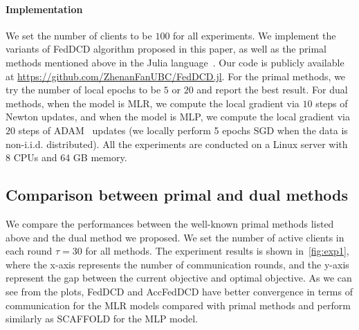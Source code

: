 \paragraph{Implementation}  We set the number of clients to be $100$ for all experiments. We implement the variants of FedDCD algorithm proposed in this paper, as well as the primal methods mentioned above in the Julia language~\citep{bezanson2017julia}. Our code is publicly available at \url{https://github.com/ZhenanFanUBC/FedDCD.jl}. For the primal methods, we try the number of local epochs to be $5$ or $20$ and report the best result. For dual methods, when the model is MLR, we compute the local gradient via $10$ steps of Newton updates, and when the model is MLP, we compute the local gradient via $20$ steps of ADAM~\citep{kingma2014adam} updates (we locally perform 5 epochs SGD when the data is non-i.i.d. distributed). All the experiments are conducted on a Linux server with 8 CPUs and 64 GB memory. 

\subsection{Comparison between primal and dual methods} \label{sec:exp1}

We compare the performances between the well-known primal methods listed above and the dual method we proposed. We set the number of active clients in each round $\tau = 30$ for all methods. The experiment results is shown in~\autoref{fig:exp1}, 
where the x-axis represents the number of communication rounds, and the y-axis represent the gap between the current objective and optimal objective. 
As we can see from the plots, FedDCD and AccFedDCD have better convergence in terms of communication for the MLR models compared with primal methods and perform similarly as SCAFFOLD for the MLP model.


